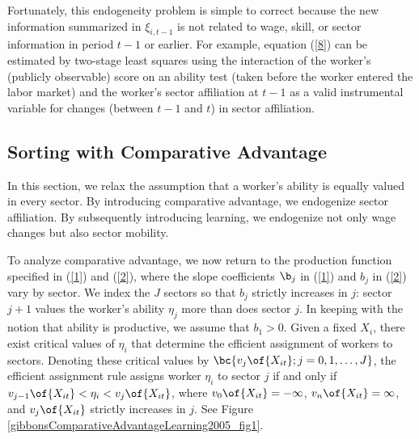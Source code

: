 \documentclass[12pt]{article}
\theoremstyle{definition}
\begin{document}
Fortunately, this endogeneity problem is simple to correct because the new information summarized in $\xi_{i, t-1}$ is not related to wage, skill, or sector information in period $t-1$ or earlier. For example, equation (\ref{8}) can be estimated by two-stage least squares using the interaction of the worker's (publicly observable) score on an ability test (taken before the worker entered the labor market) and the worker's sector affiliation at $t-1$ as a valid instrumental variable for changes (between $t-1$ and $t$) in sector affiliation.

\subsection{Sorting with Comparative Advantage}

In this section, we relax the assumption that a worker's ability is equally valued in every sector. By introducing comparative advantage, we endogenize sector affiliation. By subsequently introducing learning, we endogenize not only wage changes but also sector mobility.

To analyze comparative advantage, we now return to the production function specified in (\ref{1}) and (\ref{2}), where the slope coefficients $\b_j$ in (\ref{1}) and $b_j$ in (\ref{2}) vary by sector. We index the $J$ sectors so that $b_j$ strictly increases in $j$: sector $j+1$ values the worker's ability $\eta_j$ more than does sector $j$. In keeping with the notion that ability is productive, we assume that $b_1 > 0$. Given a fixed $X_i$, there exist critical values of $\eta_i$ that determine the efficient assignment of workers to sectors. Denoting these critical values by $\bc{v_j\of{X_{it}}; j = 0, 1, \ldots, J}$, the efficient assignment rule assigns worker $\eta_i$ to sector $j$ if and only if $v_{j-1}\of{X_{it}} < \eta_i < v_{j}\of{X_{it}}$, where $v_{0}\of{X_{it}} = -\infty$, $v_{n}\of{X_{it}} = \infty$, and $v_j\of{X_{it}}$ strictly increases in $j$. See Figure \ref{gibbonsComparativeAdvantageLearning2005_fig1}.
\end{document}
